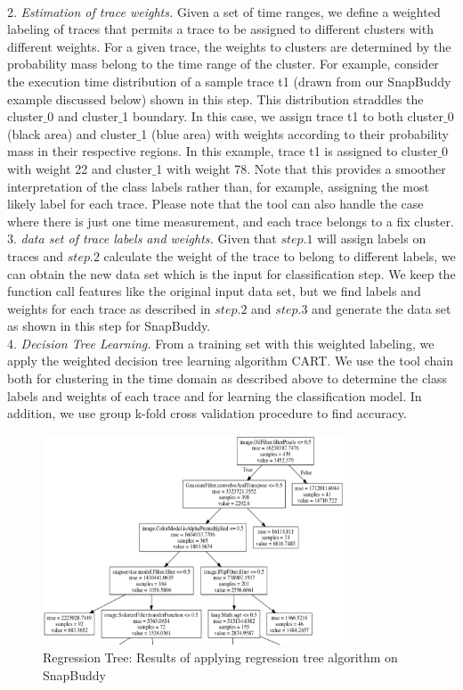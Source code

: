 \documentclass{article}
\begin{document}
\\2. \smallskip\textit{Estimation of trace weights.}
Given a set of time ranges, we define a weighted labeling of traces
that permits a trace to be assigned to different clusters with different weights.
For a given trace, the weights to clusters are determined by the
probability mass belong to the time range of the cluster.  For
example, consider the execution time distribution of a sample trace t1
(drawn from our SnapBuddy example discussed below) shown in
this step. This distribution straddles the
cluster$\_$0 and cluster$\_$1 boundary.  In this case, we assign trace
t1 to both cluster$\_$0 (black area) and cluster$\_$1 (blue area) with
weights according to their probability mass in their respective
regions. In this example, trace t1 is assigned
to cluster$\_$0 with weight 22 and cluster$\_$1 with weight 78. Note
that this provides a smoother interpretation of the class labels
rather than, for example, assigning the most likely label for each
trace. Please note that the tool can also handle the case where
there is just one time measurement, and each trace belongs to a
fix cluster. \\
3. \smallskip\textit{data set of trace labels and weights.}
Given that $step.1$ will assign labels on traces and $step.2$
calculate the weight of the trace to belong to different labels,
we can obtain the new data set which is the input for classification step. 
We keep the function call features like the original input data set, but we
find labels and weights for each trace as described in $step.2$ and $step.3$
and generate the data set as shown in this step for SnapBuddy. \\
4. \smallskip\textit{Decision Tree Learning.}
From a training set with this weighted labeling, we apply the weighted
decision tree learning algorithm CART.
We use the tool chain both for clustering in the time domain as described
above to determine the class labels and weights of each trace and for
learning the classification model. In addition, we use group k-fold cross
validation procedure to find accuracy. 
\begin{figure}[t]
    \centering
    \includegraphics[width=0.8\textwidth]{Regression_Tree}
    \caption{Regression Tree: Results of applying regression tree algorithm on SnapBuddy}
    \label{Regression_Tree}
\end{figure}
\end{document}
